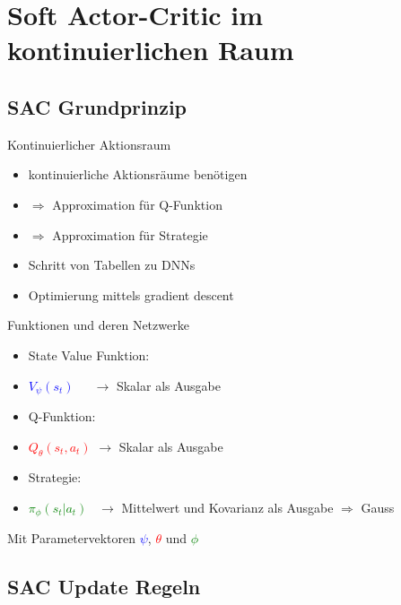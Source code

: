\section{Soft Actor-Critic im kontinuierlichen Raum}
\subsection{SAC Grundprinzip}

\begin{frame}{Kontinuierlicher Aktionsraum}
\begin{itemize}
\item kontinuierliche Aktionsräume benötigen
\item[] $\Rightarrow$ Approximation für Q-Funktion
\item[] $\Rightarrow$ Approximation für Strategie \\[12pt]
\item Schritt von Tabellen zu DNNs
\item Optimierung mittels gradient descent
\end{itemize}
\end{frame}

\begin{frame}{Funktionen und deren Netzwerke}
\begin{itemize}
\item State Value Funktion:
\item[] \textcolor{blue}{$V_{\psi}(s_{t})$} \,\,\,\,\,		$\rightarrow$ Skalar als Ausgabe \\[6pt]
\item Q-Funktion:
\item[] \textcolor{red}{$Q_{\theta}(s_{t},a_{t})$}		$\rightarrow$ Skalar als Ausgabe \\[6pt]
\item Strategie:
\item[] \textcolor{green}{$\pi_{\phi}(s_{t}|a_{t})$} \,	$\rightarrow$ Mittelwert und Kovarianz als Ausgabe $\Rightarrow$ Gauss \\[12pt]
\end{itemize}
Mit Parametervektoren \textcolor{blue}{$\psi$}, \textcolor{red}{$\theta$} und \textcolor{green}{$\phi$}
\end{frame}

\subsection{SAC Update Regeln}

